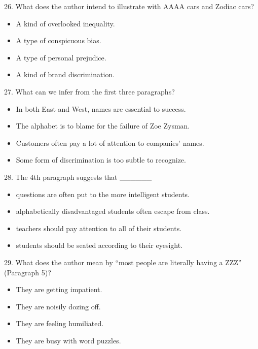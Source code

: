 \documentclass[UTF8,11pt]{ctexart}
\begin{document}
26. What does the author intend to illustrate with AAAA cars and Zodiac cars?


\begin{itemize}[leftmargin=2em,itemsep=.2em,topsep=.4em]\item[A.] A kind of overlooked inequality.
\item[B.] A type of conspicuous bias.
\item[C.] A type of personal prejudice.
\item[D.] A kind of brand discrimination.
\end{itemize}

27. What can we infer from the first three paragraphs?


\begin{itemize}[leftmargin=2em,itemsep=.2em,topsep=.4em]\item[A.] In both East and West, names are essential to success.
\item[B.] The alphabet is to blame for the failure of Zoe Zysman.
\item[C.] Customers often pay a lot of attention to companies’ names.
\item[D.] Some form of discrimination is too subtle to recognize.
\end{itemize}

28. The 4th paragraph suggests that \_\_\_\_\_\_


\begin{itemize}[leftmargin=2em,itemsep=.2em,topsep=.4em]\item[A.] questions are often put to the more intelligent students.
\item[B.] alphabetically disadvantaged students often escape from class.
\item[C.] teachers should pay attention to all of their students.
\item[D.] students should be seated according to their eyesight.
\end{itemize}

29. What does the author mean by “most people are literally having a ZZZ” (Paragraph 5)?


\begin{itemize}[leftmargin=2em,itemsep=.2em,topsep=.4em]\item[A.] They are getting impatient.
\item[B.] They are noisily dozing off.
\item[C.] They are feeling humiliated.
\item[D.] They are busy with word puzzles.
\end{itemize}
\end{document}
